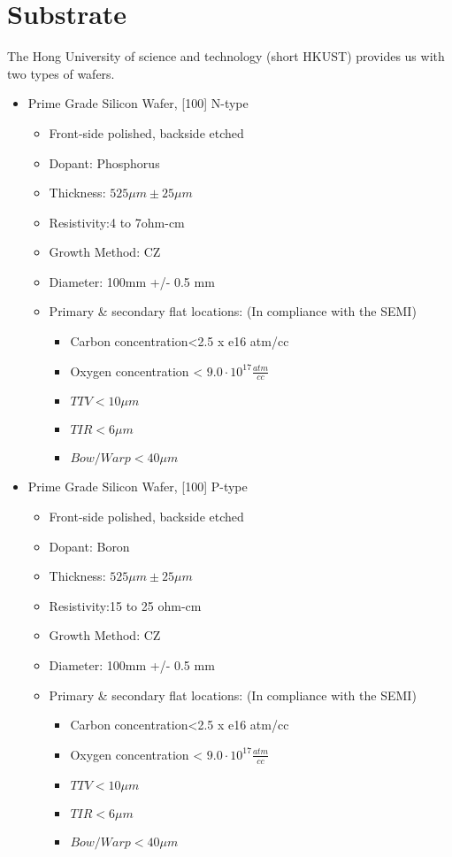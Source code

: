 \section{Substrate}

The Hong University of science and technology (short HKUST) provides us with two types of wafers.

\begin{itemize}
	\item Prime Grade Silicon Wafer, [100] N-type
	\begin{itemize}
		\item Front-side polished, backside etched
		\item Dopant: Phosphorus
		\item Thickness: $525 \mu m \pm 25 \mu m$
		\item Resistivity:4 to 7ohm-cm
		\item Growth Method: CZ
		\item Diameter: 100mm +/- 0.5 mm
		\item Primary  \& secondary flat locations: (In compliance with the SEMI)
			\begin{itemize}
				\item Carbon concentration<2.5 x e16 atm/cc
				\item Oxygen concentration < $9.0 \cdot 10^{17} \frac{atm}{cc}$
				\item $TTV < 10 \mu m$
				\item $TIR < 6 \mu m$
				\item $Bow/Warp < 40 \mu m$
			\end{itemize}
	\end{itemize}
	\item Prime Grade Silicon Wafer, [100] P-type
	\begin{itemize}
		\item Front-side polished, backside etched
		\item Dopant: Boron
		\item Thickness: $525 \mu m \pm 25 \mu m$
		\item Resistivity:15 to 25 ohm-cm
		\item Growth Method: CZ
		\item Diameter: 100mm +/- 0.5 mm
		\item Primary  \& secondary flat locations: (In compliance with the SEMI)
			\begin{itemize}
				\item Carbon concentration<2.5 x e16 atm/cc
				\item Oxygen concentration < $9.0 \cdot 10^{17} \frac{atm}{cc}$
				\item $TTV < 10 \mu m$
				\item $TIR < 6 \mu m$
				\item $Bow/Warp < 40 \mu m$
			\end{itemize}
	\end{itemize}
\end{itemize}

